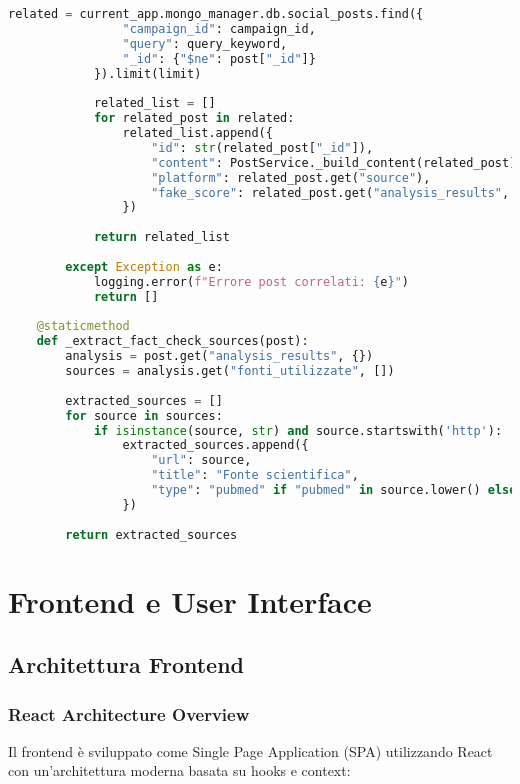 \documentclass[12pt,a4paper]{report}
\begin{document}
\begin{lstlisting}[language=Python, caption=Post Service]
            related = current_app.mongo_manager.db.social_posts.find({
                "campaign_id": campaign_id,
                "query": query_keyword,
                "_id": {"$ne": post["_id"]}
            }).limit(limit)
            
            related_list = []
            for related_post in related:
                related_list.append({
                    "id": str(related_post["_id"]),
                    "content": PostService._build_content(related_post)[:100] + "...",
                    "platform": related_post.get("source"),
                    "fake_score": related_post.get("analysis_results", {}).get("grado_disinformazione", 0)
                })
            
            return related_list
            
        except Exception as e:
            logging.error(f"Errore post correlati: {e}")
            return []
    
    @staticmethod
    def _extract_fact_check_sources(post):
        analysis = post.get("analysis_results", {})
        sources = analysis.get("fonti_utilizzate", [])
        
        extracted_sources = []
        for source in sources:
            if isinstance(source, str) and source.startswith('http'):
                extracted_sources.append({
                    "url": source,
                    "title": "Fonte scientifica",
                    "type": "pubmed" if "pubmed" in source.lower() else "institutional"
                })
        
        return extracted_sources
\end{lstlisting}

\chapter{Frontend e User Interface}

\section{Architettura Frontend}

\subsection{React Architecture Overview}

Il frontend è sviluppato come Single Page Application (SPA) utilizzando React con un'architettura moderna basata su hooks e context:
\end{document}
